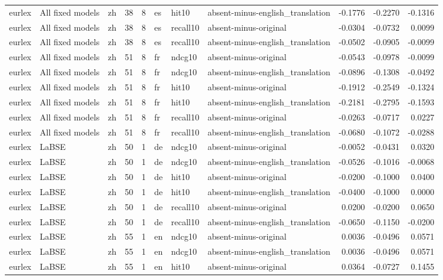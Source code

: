 \begin{tabular}{lllrrlllrrr}
eurlex & All fixed models & zh & 38 & 8 & es & hit10 & absent-minus-english\_translation & -0.1776 & -0.2270 & -0.1316 \\
eurlex & All fixed models & zh & 38 & 8 & es & recall10 & absent-minus-original & -0.0304 & -0.0732 & 0.0099 \\
eurlex & All fixed models & zh & 38 & 8 & es & recall10 & absent-minus-english\_translation & -0.0502 & -0.0905 & -0.0099 \\
eurlex & All fixed models & zh & 51 & 8 & fr & ndcg10 & absent-minus-original & -0.0543 & -0.0978 & -0.0099 \\
eurlex & All fixed models & zh & 51 & 8 & fr & ndcg10 & absent-minus-english\_translation & -0.0896 & -0.1308 & -0.0492 \\
eurlex & All fixed models & zh & 51 & 8 & fr & hit10 & absent-minus-original & -0.1912 & -0.2549 & -0.1324 \\
eurlex & All fixed models & zh & 51 & 8 & fr & hit10 & absent-minus-english\_translation & -0.2181 & -0.2795 & -0.1593 \\
eurlex & All fixed models & zh & 51 & 8 & fr & recall10 & absent-minus-original & -0.0263 & -0.0717 & 0.0227 \\
eurlex & All fixed models & zh & 51 & 8 & fr & recall10 & absent-minus-english\_translation & -0.0680 & -0.1072 & -0.0288 \\
eurlex & LaBSE & zh & 50 & 1 & de & ndcg10 & absent-minus-original & -0.0052 & -0.0431 & 0.0320 \\
eurlex & LaBSE & zh & 50 & 1 & de & ndcg10 & absent-minus-english\_translation & -0.0526 & -0.1016 & -0.0068 \\
eurlex & LaBSE & zh & 50 & 1 & de & hit10 & absent-minus-original & -0.0200 & -0.1000 & 0.0400 \\
eurlex & LaBSE & zh & 50 & 1 & de & hit10 & absent-minus-english\_translation & -0.0400 & -0.1000 & 0.0000 \\
eurlex & LaBSE & zh & 50 & 1 & de & recall10 & absent-minus-original & 0.0200 & -0.0200 & 0.0650 \\
eurlex & LaBSE & zh & 50 & 1 & de & recall10 & absent-minus-english\_translation & -0.0650 & -0.1150 & -0.0200 \\
eurlex & LaBSE & zh & 55 & 1 & en & ndcg10 & absent-minus-original & 0.0036 & -0.0496 & 0.0571 \\
eurlex & LaBSE & zh & 55 & 1 & en & ndcg10 & absent-minus-english\_translation & 0.0036 & -0.0496 & 0.0571 \\
eurlex & LaBSE & zh & 55 & 1 & en & hit10 & absent-minus-original & 0.0364 & -0.0727 & 0.1455 \\

\end{tabular}
